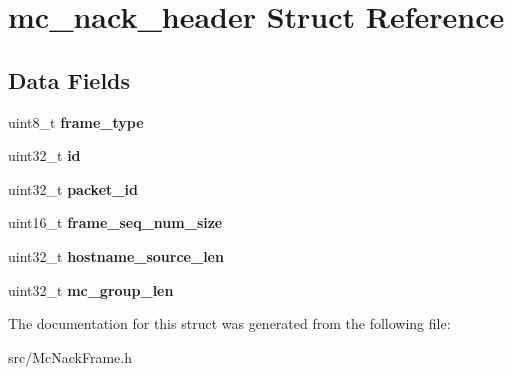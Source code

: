 \hypertarget{structmc__nack__header}{\section{mc\-\_\-nack\-\_\-header Struct Reference}
\label{structmc__nack__header}
}
\subsection*{Data Fields}
\begin{DoxyCompactItemize}
\item 
\hypertarget{structmc__nack__header_ad736cea9bec12e7e3f6155aa72d0d410}{uint8\-\_\-t {\bfseries frame\-\_\-type}}\label{structmc__nack__header_ad736cea9bec12e7e3f6155aa72d0d410}

\item 
\hypertarget{structmc__nack__header_afed629fd0a315244f5803976cb78c6d6}{uint32\-\_\-t {\bfseries id}}\label{structmc__nack__header_afed629fd0a315244f5803976cb78c6d6}

\item 
\hypertarget{structmc__nack__header_add97b1d324d455ce9f980e3ffbf6ddbb}{uint32\-\_\-t {\bfseries packet\-\_\-id}}\label{structmc__nack__header_add97b1d324d455ce9f980e3ffbf6ddbb}

\item 
\hypertarget{structmc__nack__header_ab18b33d8b6bc41eb7863f39b7a407ef5}{uint16\-\_\-t {\bfseries frame\-\_\-seq\-\_\-num\-\_\-size}}\label{structmc__nack__header_ab18b33d8b6bc41eb7863f39b7a407ef5}

\item 
\hypertarget{structmc__nack__header_a2e896998f66d2ccc7191625a478e4c38}{uint32\-\_\-t {\bfseries hostname\-\_\-source\-\_\-len}}\label{structmc__nack__header_a2e896998f66d2ccc7191625a478e4c38}

\item 
\hypertarget{structmc__nack__header_a45e48b0def7e75520e8445f4984de79d}{uint32\-\_\-t {\bfseries mc\-\_\-group\-\_\-len}}\label{structmc__nack__header_a45e48b0def7e75520e8445f4984de79d}

\end{DoxyCompactItemize}


The documentation for this struct was generated from the following file\-:\begin{DoxyCompactItemize}
\item 
src/Mc\-Nack\-Frame.\-h\end{DoxyCompactItemize}
